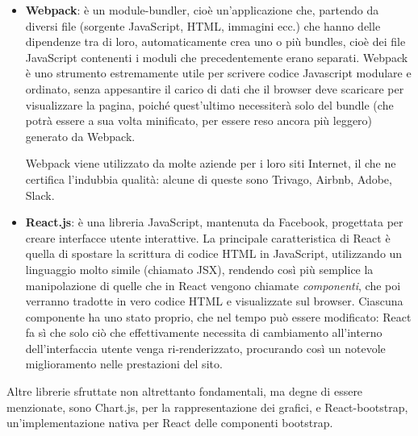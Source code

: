\begin{itemize}
    \item \textbf{Webpack}: è un module-bundler, cioè un'applicazione che, partendo da diversi file (sorgente JavaScript, HTML, immagini ecc.) che hanno delle dipendenze tra di loro, automaticamente crea uno o più bundles, cioè dei file JavaScript contenenti i moduli che precedentemente erano separati. Webpack è uno strumento estremamente utile per scrivere codice Javascript modulare e ordinato, senza appesantire il carico di dati che il browser deve scaricare per visualizzare la pagina, poiché quest'ultimo necessiterà solo del bundle (che potrà essere a sua volta minificato, per essere reso ancora più leggero) generato da Webpack.

    Webpack viene utilizzato da molte aziende per i loro siti Internet, il che ne certifica l'indubbia qualità: alcune di queste sono Trivago, Airbnb, Adobe, Slack.

    \item \textbf{React.js}: è una libreria JavaScript, mantenuta da Facebook, progettata per creare interfacce utente interattive. La principale caratteristica di React è quella di spostare la scrittura di codice HTML in JavaScript, utilizzando un linguaggio molto simile (chiamato JSX), rendendo così più semplice la manipolazione di quelle che in React vengono chiamate \textit{componenti}, che poi verranno tradotte in vero codice HTML e visualizzate sul browser. Ciascuna componente ha uno stato proprio, che nel tempo può essere modificato: React fa sì che solo ciò che effettivamente necessita di cambiamento all'interno dell'interfaccia utente venga ri-renderizzato, procurando così un notevole miglioramento nelle prestazioni del sito.
\end{itemize}
Altre librerie sfruttate non altrettanto fondamentali, ma degne di essere menzionate, sono Chart.js, per la rappresentazione dei grafici, e React-bootstrap, un'implementazione nativa per React delle componenti bootstrap.